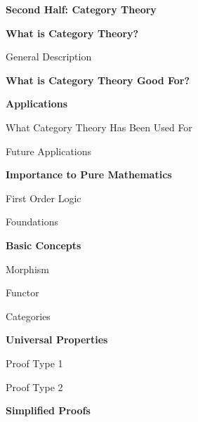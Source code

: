 \documentclass[10pt]{article}
\begin{document}
\begin{outline}
    \item \large \textbf{Second Half: Category Theory}
    \normalsize
    \begin{outline}	
	    \item \textbf{What is Category Theory?}
		    \begin{outline}
		        \item General Description    
		    \end{outline}
	    \item \textbf{What is Category Theory Good For?}
		\item \textbf{Applications}
            \begin{outline}			
			    \item What Category Theory Has Been Used For
			    \item Future Applications
			\end{outline}
		\item \textbf{Importance to Pure Mathematics}
		    \begin{outline}
			    \item First Order Logic
			    \item Foundations
            \end{outline}	
	    \item \textbf{Basic Concepts}
            \begin{outline}		
		        \item Morphism
		        \item Functor
		        \item Categories
		    \end{outline}
	    \item \textbf{Universal Properties}
            \begin{outline}		    
		        \item Proof Type 1
		        \item Proof Type 2
		    \end{outline}
	    \item \textbf{Simplified Proofs}
    \end{outline}
\end{outline}
\end{document}
